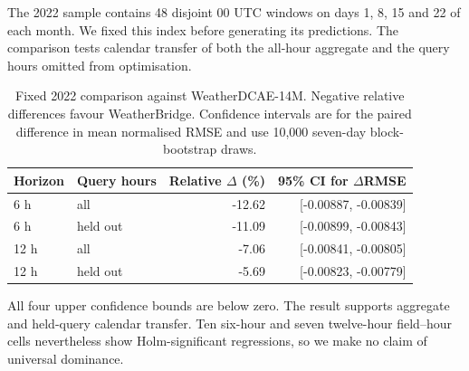 The 2022 sample contains 48 disjoint 00 UTC windows on days 1, 8, 15 and 22 of
each month. We fixed this index before generating its predictions. The
comparison tests calendar transfer of both the all-hour aggregate and the
query hours omitted from optimisation.
\begin{table}[t]
\centering
\caption{Fixed 2022 comparison against WeatherDCAE-14M. Negative relative
differences favour WeatherBridge. Confidence intervals are for the paired
difference in mean normalised RMSE and use 10,000 seven-day block-bootstrap
draws.}
\label{tab:postselection-2022}
\small
\begin{tabular}{llrr}
\toprule
Horizon & Query hours & Relative $\Delta$ (\%) & 95\% CI for $\Delta$RMSE \\
\midrule
6 h & all & -12.62 & [-0.00887, -0.00839] \\
6 h & held out & -11.09 & [-0.00899, -0.00843] \\
12 h & all & -7.06 & [-0.00841, -0.00805] \\
12 h & held out & -5.69 & [-0.00823, -0.00779] \\
\bottomrule
\end{tabular}
\end{table}
All four upper confidence bounds are below zero. The result supports aggregate
and held-query calendar transfer. Ten six-hour and seven twelve-hour
field--hour cells nevertheless show Holm-significant regressions, so we make
no claim of universal dominance.
